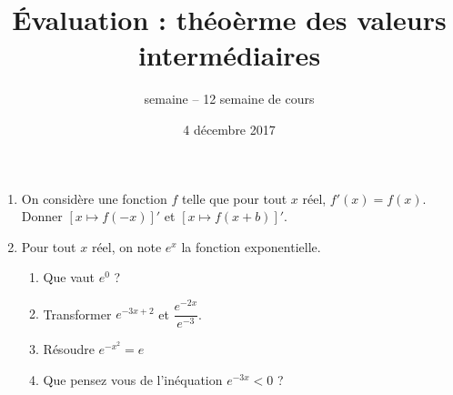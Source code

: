 \documentclass[a4paper,12pt,frenchb]{article}
\title{Évaluation : théoèrme des valeurs intermédiaires}
\author{semaine \no{49} -- 12\up{ième} semaine de cours}
\date{4 décembre 2017}
\begin{document}
\maketitle

\thispagestyle{fancy}

\begin{question}[subtitle={expo}]
  \begin{enumerate}
    \item On considère une fonction $f$ telle que pour tout $x$ réel, $f'(x)
      = f(x)$. Donner $[x \mapsto f(-x)]'$ et $[x \mapsto f(x + b)]'$.
    \item Pour tout $x$ réel, on note $e^x$ la fonction exponentielle.
      \begin{enumerate}
        \item Que vaut $e^0$ ?
        \item Transformer $e^{- 3x + 2}$ et $\dfrac{e^{-2x}}{e^{-3}}$.
        \item Résoudre $e^{-x^2} = e$
        \item Que pensez vous de l'inéquation $e^{-3x} < 0$ ?
      \end{enumerate}
  \end{enumerate}
\end{question}
\end{document}
